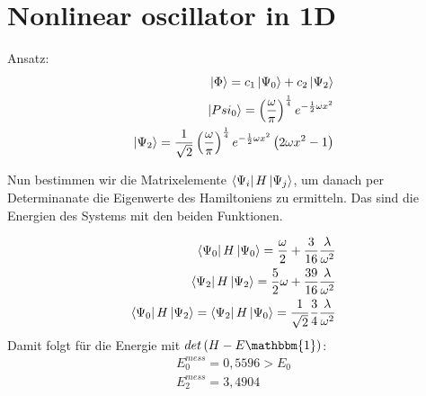 \section{Nonlinear oscillator in 1D}


Ansatz:
\begin{align}
\Ket{\Phi} = c_{1} \Ket{\Psi_{0}} + c_{2} \Ket{\Psi_{2}} \\
\Ket{Psi_{0}} = \left( \frac{\omega}{\pi} \right)^{\frac{1}{4}} e^{-\frac{1}{2}\omega x^2} \\
\Ket{\Psi_{2}} = \frac{1}{\sqrt{2}} \left( \frac{\omega}{\pi} \right)^{\frac{1}{4}} e^{-\frac{1}{2}\omega x^2} \left( 2\omega x^2 -1 \right)
\end{align}

Nun bestimmen wir die Matrixelemente $\Bra{\Psi_{i}} H \Ket{\Psi_{j}}$, um danach per Determinanate die Eigenwerte des Hamiltoniens zu ermitteln. Das sind die Energien des Systems mit den beiden Funktionen.

\begin{align}
\Bra{\Psi_{0}} H \Ket{\Psi_{0}} = \frac{\omega}{2} + \frac{3}{16}  \frac{\lambda}{\omega^2} \\
\Bra{\Psi_{2}} H \Ket{\Psi_{2}} = \frac{5}{2} \omega + \frac{39}{16} \frac{\lambda}{\omega^2} \\
\Bra{\Psi_{0}} H \Ket{\Psi_{2}} = \Bra{\Psi_{2}} H \Ket{\Psi_{0}} = \frac{1}{\sqrt{2}} \frac{3}{4} \frac{\lambda}{\omega^2}
\end{align}
Damit folgt f\"ur die Energie mit $det \left( H - E\mathbbm{1} \right) $:
\begin{align}
E_{0}^{mess} = 0,5596 > E_{0} \\
E_{2}^{mess} = 3,4904
\end{align}


